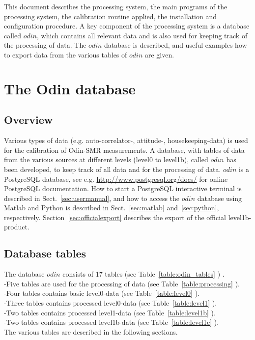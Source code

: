 \documentclass[12pt]{article}
\begin{document}
This document describes the processing system,
the main programs of the processing system,
the calibration routine applied,  
the installation and configuration procedure.
A key component of the processing system is a database 
called \(odin\), which contains all relevant data
and is also used for keeping track of the processing of data.
The \(odin\) database is described, and useful examples
how to export data from the various tables of \(odin\) are given.


\clearpage
\newpage


\section{The Odin database}
\subsection{Overview}
Various types of data 
(e.g. auto-correlator-, attitude-, housekeeping-data) is used for the 
calibration of Odin-SMR measurements.
A database, with tables of data from the various sources at different levels
(level0 to level1b), 
called \(odin\) has been developed, to keep track of all
data and for the processing of data.
\(odin\) is a PostgreSQL database, see e.g. \url{http://www.postgresql.org/docs/} for online PostgreSQL documentation.
How to start a PostgreSQL interactive terminal is described in 
Sect.~\ref{sec:usermanual}, and how to 
access the \(odin\) database using Matlab
and Python is described in Sect.~\ref{sec:matlab} and~\ref{sec:python},
respectively. 
Section~\ref{sec:officialexport} describes the export of the
official level1b-product.

\subsection{Database tables}
The database \(odin\) consists of 17 tables (see Table~\ref{table:odin_tables} ) .\\ 
-Five tables are used for the processing of data (see Table~\ref{table:processing} ).\\
-Four tables contains basic level0-data (see Table~\ref{table:level0} ).\\
-Three tables contains processed level0-data (see Table~\ref{table:level1} ).\\ 
-Two tables contains processed level1-data (see Table~\ref{table:level1b} ).\\ 
-Two tables contains processed level1b-data (see Table~\ref{table:level1c} ).\\ 
The various tables are described in the following sections.
\end{document}
